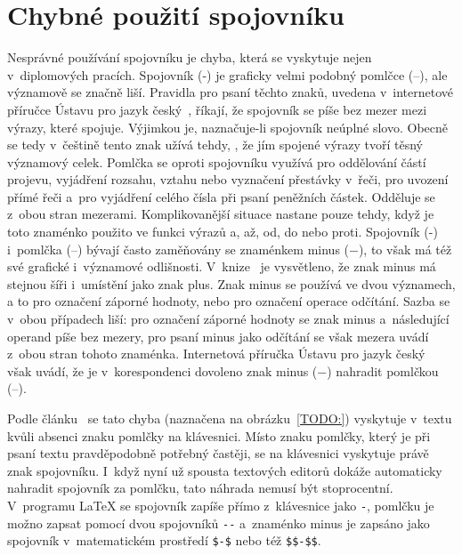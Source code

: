 \section{Chybné použití spojovníku}
Nesprávné používání spojovníku je chyba, která se vyskytuje nejen v~diplomových
pracích. Spojovník (-) je graficky velmi podobný pomlčce (--), ale významově
se značně liší. Pravidla pro psaní těchto znaků, uvedena v~internetové příručce
Ústavu pro jazyk český~\cite{Ustav_pro_jazyk_cesky},
říkají, že spojovník se píše bez mezer mezi výrazy, které spojuje. Výjimkou
je, naznačuje-li spojovník neúplné slovo. Obecně se tedy v~češtině tento znak
užívá tehdy, , že jím spojené výrazy tvoří těsný významový
celek. Pomlčka se oproti spojovníku využívá pro oddělování částí projevu,
vyjádření rozsahu, vztahu nebo vyznačení přestávky v~řeči, pro uvození
přímé řeči a~pro vyjádření celého čísla při psaní peněžních částek.
Odděluje se z~obou stran mezerami. Komplikovanější situace nastane pouze
tehdy, když je toto znaménko použito ve funkci výrazů a, až, od, do nebo proti.
Spojovník (-) i~pomlčka (--) bývají často zaměňovány se znaménkem minus ($-$),
to však má též své grafické i~významové odlišnosti.
V~knize~\cite{Pruvodce_tvorbou_dokumentu} je vysvětleno, že znak minus má stejnou
šíři i~umístění jako znak plus. Znak minus se používá ve dvou významech, a to
pro označení záporné hodnoty, nebo pro označení operace odčítání. Sazba se v~obou
případech liší: pro označení záporné hodnoty se znak minus a~následující
operand píše bez mezery, pro psaní minus jako odčítání se však mezera uvádí
z~obou stran tohoto znaménka. Internetová příručka Ústavu pro jazyk
český~\cite{Ustav_pro_jazyk_cesky} však uvádí, že je v~korespondenci dovoleno
znak minus ($-$) nahradit pomlčkou (--).

Podle článku~\cite{Zaklady_typografie:Slezakova} se tato chyba (naznačena na
obrázku~\ref{TODO:}) vyskytuje v~textu kvůli absenci znaku pomlčky na klávesnici.
Místo znaku pomlčky, který je při psaní textu pravděpodobně potřebný častěji,
se na klávesnici vyskytuje právě znak spojovníku. I~když nyní už spousta
textových editorů dokáže automaticky nahradit spojovník za pomlčku, tato náhrada
nemusí být stoprocentní. V~programu {\LaTeX} se spojovník zapíše přímo
z~klávesnice jako \verb|-|,
pomlčku je možno zapsat pomocí dvou spojovníků \verb|--| a~znaménko minus je
zapsáno jako spojovník v~matematickém prostředí \verb|$-$| nebo též \verb|$$-$$|.



